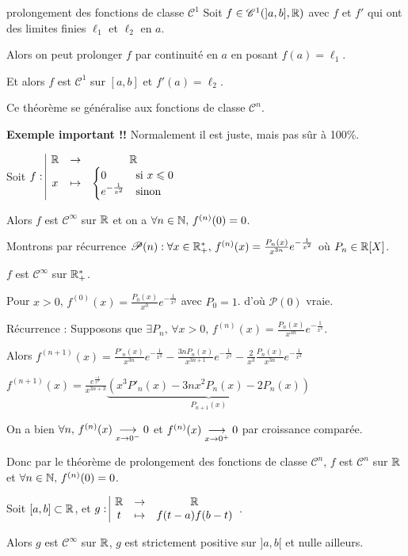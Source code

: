 \begin{theoreme}{prolongement des fonctions de classe $\mathscr C^1$}{}
    Soit $f \in \mathscr C^1(]a, b], \mathbb{R})$ avec $f$ et $f'$ qui ont des limites finies 
    $\ell_1$ et $\ell_2$ en $a$. 

    Alors on peut prolonger $f$ par continuité en $a$ en posant $f(a) = \ell_1$.

    Et alors $f$ est $\mathscr C^1$ sur $[a, b]$ et $f'(a) = \ell_2$.
\end{theoreme}

\begin{remarque}
    Ce théorème se généralise aux fonctions de classe $\mathscr C^n$.
\end{remarque}

\begin{exemple}
    \textbf{Exemple important !!}
    Normalement il est juste, mais pas sûr à 100\%.

    Soit $f: \space \begin{array}{|ccc} \displaystyle \mathbb{R} & \to & \displaystyle \mathbb{R} \\ \displaystyle x & \mapsto & \displaystyle \begin{cases}
        0 & \text{si } x \leqslant 0\\
        e^{-\frac{1}{x^2}} & \text{sinon}
    \end{cases} \end{array}$

    Alors $f$ est $\mathscr C^\infty$ sur $\mathbb{R}$ et on a $\forall n \in \mathbb{N}, \, f^{(n)}(0) = 0$.

    Montrons par récurrence $\mathscr P(n) : \forall x \in \mathbb{R}_+^*, \, f^{(n)}(x) = \frac{P_n(x) }{x^{3n}} e^{-\frac{1}{x^2}}$ où $P_n \in \mathbb{R} [X]$. 

    $f$ est $\mathscr C^\infty$ sur $\mathbb{R}_+^*$. 

    Pour $x > 0$, $f^{(0)}(x) = \frac{P_0(x )}{x^0} e^{-\frac{1}{x^2}}$ avec $P_0 = 1$.
    d'où $\mathscr P(0)$ vraie.

    \avspace Récurrence : Supposons que $\displaystyle \exists P_n, \, \forall x > 0, \, f^{(n)}(x) = \frac{P_n(x)}{x^{3n}} e^{-\frac{1}{x^2}}$.

    Alors $\displaystyle f^{(n+1)}(x) = \frac{P'_n(x)}{x^{3n}} e^{-\frac{1}{x^2}}  - \frac{3n P_n(x)}{x^{3n + 1}}e^{-\frac{1}{x^2}} - \frac 2 {x^3} \frac{P_n(x)}{x^{3n}}e^{-\frac{1}{x^2}}$

    $f^{(n+1)}(x) = \frac{e^{\frac{-1}{x^2}}}{x^{3n + 3}} \underbrace{\left( x^3 P'_n(x) - 3nx^2 P_n(x) - 2P_n(x) \right)}_{P_{n+1}(x)}$

    On a bien $\forall n, \, f^{(n)}(x) \underset{x \to 0^-}{\longrightarrow} 0 $ et $f^{(n)}(x) \underset{x \to 0^+}{\longrightarrow} 0$ par croissance comparée. 

    Donc par le théorème de prolongement des fonctions de classe $\mathscr C^n$, $f$ est $\mathscr C^n$ sur $\mathbb{R}$ et $\forall n \in \mathbb{N}, \, f^{(n)}(0) = 0$.


    Soit $[a, b] \subset \mathbb{R}$, et $g: \space \begin{array}{|ccc} \displaystyle \mathbb{R} & \to & \displaystyle \mathbb{R} \\ \displaystyle t & \mapsto & \displaystyle f(t-a)f(b-t) \end{array}$.

    Alors $g$ est $\mathscr C^\infty$ sur $\mathbb{R}$, $g$ est strictement positive sur $]a, b[$ et nulle ailleurs.

\end{exemple}


